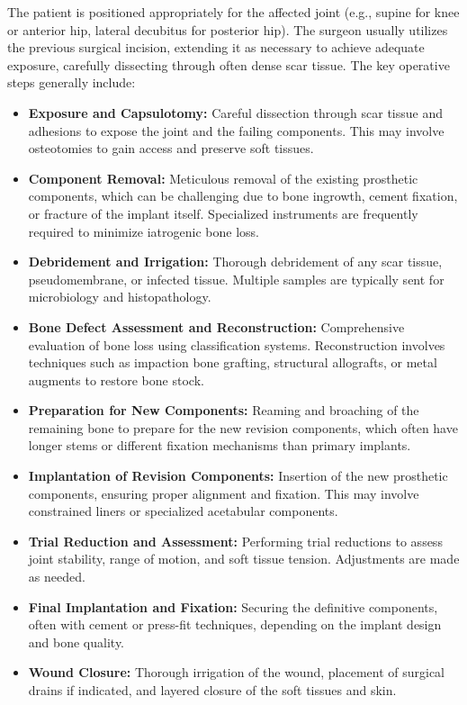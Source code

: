 The patient is positioned appropriately for the affected joint (e.g., supine for knee or anterior hip, lateral decubitus for posterior hip). The surgeon usually utilizes the previous surgical incision, extending it as necessary to achieve adequate exposure, carefully dissecting through often dense scar tissue. The key operative steps generally include:

\begin{itemize}
  \item \textbf{Exposure and Capsulotomy:} Careful dissection through scar tissue and adhesions to expose the joint and the failing components. This may involve osteotomies to gain access and preserve soft tissues.
  
  \item \textbf{Component Removal:} Meticulous removal of the existing prosthetic components, which can be challenging due to bone ingrowth, cement fixation, or fracture of the implant itself. Specialized instruments are frequently required to minimize iatrogenic bone loss.
  
  \item \textbf{Debridement and Irrigation:} Thorough debridement of any scar tissue, pseudomembrane, or infected tissue. Multiple samples are typically sent for microbiology and histopathology.
  
  \item \textbf{Bone Defect Assessment and Reconstruction:} Comprehensive evaluation of bone loss using classification systems. Reconstruction involves techniques such as impaction bone grafting, structural allografts, or metal augments to restore bone stock.
  
  \item \textbf{Preparation for New Components:} Reaming and broaching of the remaining bone to prepare for the new revision components, which often have longer stems or different fixation mechanisms than primary implants.
  
  \item \textbf{Implantation of Revision Components:} Insertion of the new prosthetic components, ensuring proper alignment and fixation. This may involve constrained liners or specialized acetabular components.
  
  \item \textbf{Trial Reduction and Assessment:} Performing trial reductions to assess joint stability, range of motion, and soft tissue tension. Adjustments are made as needed.
  
  \item \textbf{Final Implantation and Fixation:} Securing the definitive components, often with cement or press-fit techniques, depending on the implant design and bone quality.
  
  \item \textbf{Wound Closure:} Thorough irrigation of the wound, placement of surgical drains if indicated, and layered closure of the soft tissues and skin.
\end{itemize}


